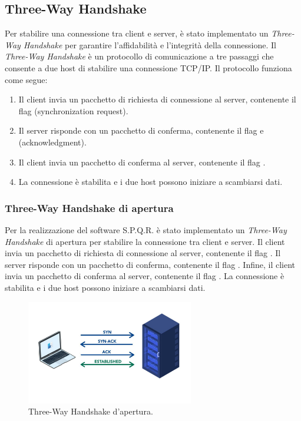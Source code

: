 \subsection{Three-Way Handshake }
Per stabilire una connessione tra client e server, è stato implementato un \textit{Three-Way Handshake} per garantire l'affidabilità e l'integrità della connessione.
Il \textit{Three-Way Handshake} è un protocollo di comunicazione a tre passaggi che consente a due host di stabilire una connessione TCP/IP.
Il protocollo funziona come segue:
\begin{enumerate}
    \item Il client invia un pacchetto di richiesta di connessione al server, contenente il flag  (synchronization request).
    \item Il server risponde con un pacchetto di conferma, contenente il flag  e  (acknowledgment).
    \item Il client invia un pacchetto di conferma al server, contenente il flag .
    \item La connessione è stabilita e i due host possono iniziare a scambiarsi dati.
\end{enumerate}

\subsubsection{Three-Way Handshake di apertura}
Per la realizzazione del software S.P.Q.R. è stato implementato un \textit{Three-Way Handshake} di apertura per stabilire la connessione tra client e server.
Il client invia un pacchetto di richiesta di connessione al server, contenente il flag .
Il server risponde con un pacchetto di conferma, contenente il flag .
Infine, il client invia un pacchetto di conferma al server, contenente il flag .
La connessione è stabilita e i due host possono iniziare a scambiarsi dati.

\begin{figure}[h]
    \centering
    \includegraphics[width=0.65\textwidth]{imgs/02/macbook_server.jpeg}
    \caption{Three-Way Handshake d'apertura.}
\end{figure}

